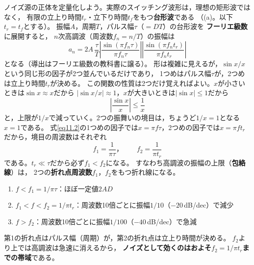ノイズ源の正体を定量化しよう。実際のスイッチング波形は，理想の矩形波ではなく，
有限の立上り時間$t_r$・立下り時間$t_f$をもつ\textbf{台形波}である
（(a)。以下$t_r = t_f$とする）。
振幅$A$，周期$T$，パルス幅$\tau$（$= DT$）の台形波を
\textbf{フーリエ級数}に展開すると，
$n$次高調波（周波数$f_n = n/T$）の振幅は
\begin{equation}
a_n = 2A\, \frac{\tau}{T}
\left| \frac{\sin (\pi f_n \tau)}{\pi f_n \tau} \right|
\left| \frac{\sin (\pi f_n t_r)}{\pi f_n t_r} \right|
\label{eq11.2}
\end{equation}
となる（導出はフーリエ級数の教科書に譲る）。
形は複雑に見えるが，$\sin x / x$という同じ形の因子が2つ並んでいるだけであり，
1つめはパルス幅$\tau$が，2つめは立上り時間$t_r$が決める。
この関数の性質は2つだけ覚えればよい。$x$が小さいときは$\sin x \approx x$だから
$|\sin x / x| \approx 1$，$x$が大きいときは$|\sin x| \le 1$だから
\begin{equation}
\left| \frac{\sin x}{x} \right| \le \frac{1}{x}
\label{eq11.3}
\end{equation}
と，上限が$1/x$で減っていく。2つの振舞いの境目は，ちょうど$1/x = 1$となる$x = 1$である。
式\ref{eq11.2}の1つめの因子では$x = \pi f \tau$，2つめの因子では$x = \pi f t_r$だから，境目の周波数はそれぞれ
\begin{equation}
f_1 = \frac{1}{\pi \tau}，\qquad f_2 = \frac{1}{\pi t_r}
\label{eq11.4}
\end{equation}
である。$t_r \ll \tau$だから必ず$f_1 < f_2$になる。
すなわち高調波の振幅の上限（\textbf{包絡線}）は，
2つの\textbf{折れ点周波数}$f_1$，$f_2$をもつ折れ線になる。

\begin{screen}
\begin{enumerate}
\item $f < f_1 = 1/\pi\tau$：ほぼ一定値$2AD$
\item $f_1 < f < f_2 = 1/\pi t_r$：周波数10倍ごとに振幅$1/10$（$-20$\,dB/dec）で減少
\item $f > f_2$：周波数10倍ごとに振幅$1/100$（$-40$\,dB/dec）で急減
\end{enumerate}
第1の折れ点はパルス幅（周期）が，第2の折れ点は立上り時間が決める。
$f_2$より上では高調波は急速に消えるから，
\textbf{ノイズとして効くのはおよそ$f_2 = 1/\pi t_r$までの帯域}である。
\end{screen}

